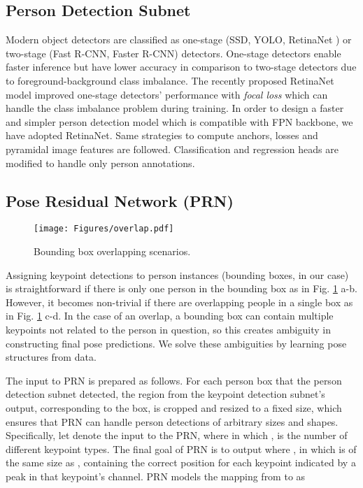 \documentclass[runningheads]{llncs}
\begin{document}
\subsection{Person Detection Subnet}
Modern object detectors are classified as one-stage (SSD\cite{liu2016ssd}, YOLO\cite{redmon}, RetinaNet \cite{Lin2017}) or two-stage (Fast R-CNN\cite{girshick15fastrcnn}, Faster R-CNN\cite{ren2015faster}) detectors. One-stage detectors enable faster inference but have lower accuracy in comparison to two-stage detectors due to foreground-background class imbalance. The recently proposed RetinaNet \cite{Lin2017} model improved one-stage detectors'   performance with \textit{focal loss} which can handle the class imbalance problem during training. In order to design a faster and simpler person detection model which is compatible with FPN backbone, we have adopted RetinaNet. Same strategies to compute anchors, losses and pyramidal image features are followed. Classification and regression heads are modified to handle only person annotations.     




\subsection{Pose Residual Network (PRN)}
\label{sec:method-prn}


\begin{figure}
\centering
\texttt{[image: Figures/overlap.pdf]}
\caption{Bounding box overlapping scenarios.}
\label{fig:overlap}
\end{figure}


Assigning keypoint detections to person instances (bounding boxes, in our case) is straightforward if there is only one person in the bounding box as in Fig. \ref{fig:overlap} a-b. However, it becomes non-trivial if there are overlapping people in a single box as in Fig. \ref{fig:overlap} c-d. In the case of an overlap, a bounding box can contain multiple keypoints not related to the person in question, so this creates ambiguity in constructing final pose predictions. We solve these ambiguities by learning pose structures from data.


The input to PRN is prepared as follows. For each person box that the person detection subnet detected, the region from the keypoint detection subnet's output, corresponding to the box, is cropped and resized to a fixed size, which ensures that PRN can handle person detections of arbitrary sizes and shapes. Specifically, let  denote the input to the PRN, where  in which ,  is the number of different keypoint types. The final goal of PRN is to output  where , in which  is of the same size as , containing the correct position for each keypoint indicated by a peak in that keypoint’s channel. PRN models the mapping from  to  as 
\end{document}
